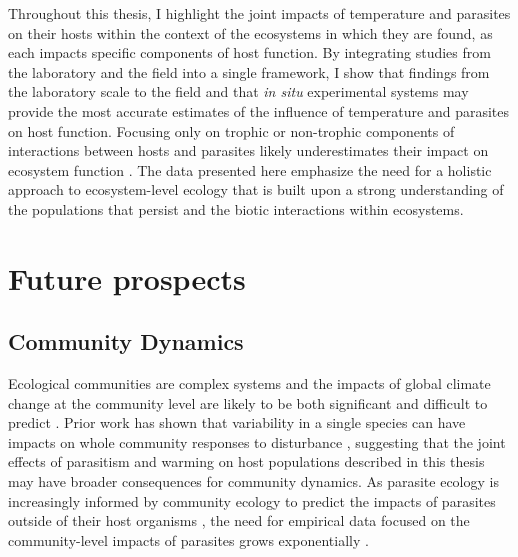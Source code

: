 Throughout this thesis, I highlight the joint impacts of temperature and parasites on their hosts within the context of the ecosystems in which they are found, as each impacts specific components of host function. By integrating studies from the laboratory and the field into a single framework, I show that findings from the laboratory scale to the field and that \textit{in situ} experimental systems may provide the most accurate estimates of the influence of temperature and parasites on host function. Focusing only on trophic or non-trophic components of interactions between hosts and parasites likely underestimates their impact on ecosystem function \citep{buck2018}. The data presented here emphasize the need for a holistic approach to ecosystem-level ecology that is built upon a strong understanding of the populations that persist and the biotic interactions within ecosystems. 

\section{Future prospects} 

\subsection{Community Dynamics}

Ecological communities are complex systems and the impacts of global climate change at the community level are likely to be both significant and difficult to predict \citep{kordas2011, hewitt2016}. Prior work has shown that variability in a single species can have impacts on whole community responses to disturbance \citep{mcclean2015, mrowicki2016}, suggesting that the joint effects of parasitism and warming on host populations described in this thesis may have broader consequences for community dynamics. As parasite ecology is increasingly informed by community ecology to predict the impacts of parasites outside of their host organisms \citep{johnson2015}, the need for empirical data focused on the community-level impacts of parasites grows exponentially \citep{poulin2018best}. 


